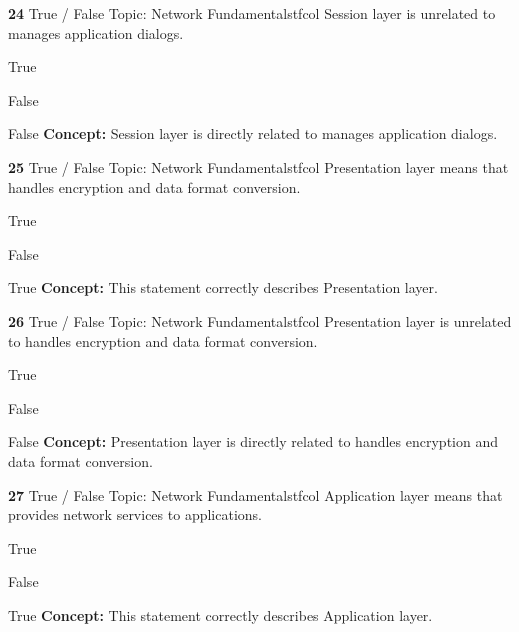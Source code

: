 \documentclass[10pt,a4paper]{article}
\begin{document}
\begin{qcard}{\color{white}\textbf{24} \hfill \small True / False \textbar{} Topic: Network Fundamentals}{tfcol}
Session layer is unrelated to manages application dialogs.

\begin{qoptions}
\item True
\item False
\end{qoptions}
\begin{explainbox}{False}
\textbf{Concept:} Session layer is directly related to manages application dialogs.
\end{explainbox}
\end{qcard}

\begin{qcard}{\color{white}\textbf{25} \hfill \small True / False \textbar{} Topic: Network Fundamentals}{tfcol}
Presentation layer means that handles encryption and data format conversion.

\begin{qoptions}
\item True
\item False
\end{qoptions}
\begin{explainbox}{True}
\textbf{Concept:} This statement correctly describes Presentation layer.
\end{explainbox}
\end{qcard}

\begin{qcard}{\color{white}\textbf{26} \hfill \small True / False \textbar{} Topic: Network Fundamentals}{tfcol}
Presentation layer is unrelated to handles encryption and data format conversion.

\begin{qoptions}
\item True
\item False
\end{qoptions}
\begin{explainbox}{False}
\textbf{Concept:} Presentation layer is directly related to handles encryption and data format conversion.
\end{explainbox}
\end{qcard}

\begin{qcard}{\color{white}\textbf{27} \hfill \small True / False \textbar{} Topic: Network Fundamentals}{tfcol}
Application layer means that provides network services to applications.

\begin{qoptions}
\item True
\item False
\end{qoptions}
\begin{explainbox}{True}
\textbf{Concept:} This statement correctly describes Application layer.
\end{explainbox}
\end{qcard}
\end{document}
